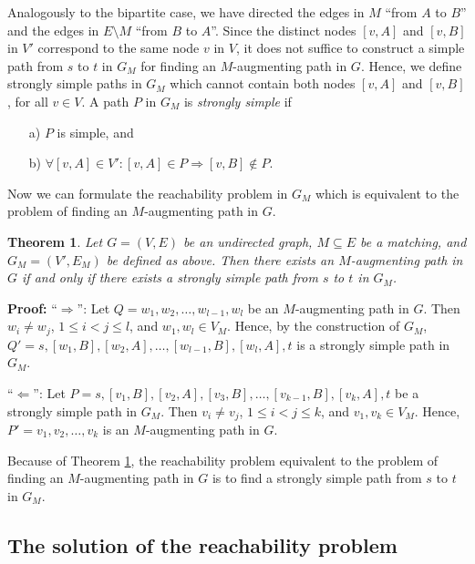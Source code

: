 \documentclass[12pt,twoside,a4paper]{article}
\def\QED{\hbox{\hskip 1pt \vrule width4pt height 6pt depth 1.5pt \hskip 1pt}}
\newtheorem{theo}{Theorem}
\begin{document}
\noindent
Analogously to the bipartite case, we have directed the edges in $M$
``from $A$ to $B$'' and the edges in $E\setminus M$ ``from $B$ to $A$''.
Since the distinct nodes $[v,A]$ and $[v,B]$ in $V'$ correspond to the same
node $v$ in $V$, it does not suffice to construct a simple path from $s$ to $t$
in $G_M$ for finding an $M$-augmenting path in $G$. Hence, we define strongly
simple paths in $G_M$ which cannot contain both nodes $[v,A]$ and $[v,B]$, for
all $v \in V$. A path $P$ in $G_M$ is {\em strongly simple} if
\begin{enumerate}
\item[a)] 
$P$ is simple, and 
\item[b)] 
$\forall [v,A] \in V': [v,A] \in P \Rightarrow [v,B]\not\in P$.
\end{enumerate}
Now we can formulate the reachability problem in $G_M$ which is equivalent to 
the problem of finding an $M$-augmenting path in $G$.

\begin{theo} \label{theo1}
Let $G=(V,E)$ be an undirected graph, $M\subseteq E$ be a matching, and
$G_M = (V',E_M)$ be defined as above. Then there exists an $M$-augmenting path
in $G$ if and only if there exists a
strongly simple path from $s$ to $t$ in $G_M$.
\end{theo}
{\bf Proof:}
``$\Rightarrow$'': Let $Q=w_1,w_2,\ldots,w_{l-1},w_l$ be an
$M$-augmenting path in $G$. Then $w_i\not= w_j$, $1\leq i<j\leq l$,
and $w_1,w_l\in V_M$. Hence, by the construction of $G_M$,
$ Q' = s,[w_1,B],[w_2,A],\ldots,[w_{l-1},B],[w_l,A],t$
is a strongly simple path in $G_M$.

\medskip
\noindent 
``$\Leftarrow$'':
Let $P=s,[v_1,B],[v_2,A],[v_3,B],\ldots,
[v_{k-1},B],[v_k,A],t$ be a strongly simple path in $G_M$. Then
$v_i\not= v_j$, $1\leq i<j\leq k$, and $v_1,v_k\in V_M$. Hence,
$P'=v_1,v_2,\ldots,v_k$ is an $M$-augmenting path in $G$.
\QED

\medskip
Because of Theorem \ref{theo1}, the reachability problem equivalent to the problem
of finding an $M$-augmenting path in $G$ is to find a 
strongly simple path from $s$ to $t$ in $G_M$.

\subsection{The solution of the reachability problem}
\end{document}
